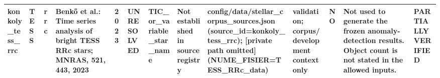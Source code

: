 \begin{longtable}{lllllllllllll}
konkoly\_tess\_rrc & TESS & rrc & Benkő et al.: Time series analysis of bright TESS RRc stars; MNRAS, 521, 443, 2023 & 2023 & UNRESOLVED & TIC\_or\_variable\_star\_name & Not established in source registry & config/data/stellar\_corpus\_sources.json (source\_id=konkoly\_tess\_rrc); [private path omitted] (NUME\_FISIER=TESS\_RRc\_data) & validation; corpus/development context only & NO & Not used to generate the frozen anomaly-detection results. Object count is not stated in the allowed inputs. & PARTIALLY VERIFIED \\
\bottomrule
\end{longtable}
